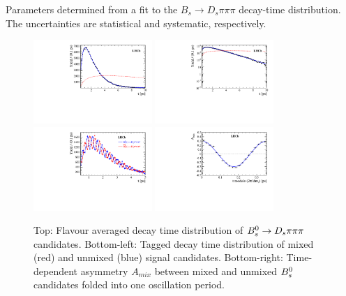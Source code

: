 \begin{table}[h]
\centering
\footnotesize
\caption{\small Parameters determined from a fit to the $B_s \to D_s \pi \pi\pi$ decay-time distribution. The uncertainties are statistical and systematic, respectively.}
	\renewcommand{\arraystretch}{1.25}
	
\label{tab:normFitResults}
\end{table}

\begin{figure}[h]
	\centering
		\includegraphics[width=0.4\textwidth, height = !]{figs/timeFit/norm_new/h_t.pdf} 
		\includegraphics[width=0.4\textwidth, height = !]{figs/timeFit/norm_new/h_t_log.pdf} 
		\includegraphics[width=0.4\textwidth, height = !]{figs/timeFit/norm_new/h_t_mixed.pdf} 
		\includegraphics[width=0.4\textwidth, height = !]{figs/timeFit/norm_new/h_asym.pdf} 		
		\caption{
		\footnotesize Top: Flavour averaged decay time distribution of ${{B}^0_{s}}\rightarrow{\ensuremath{{D}_{s}}}{\ensuremath{\pi}}{\ensuremath{\pi}}{\ensuremath{\pi}}$ candidates. 
Bottom-left: Tagged decay time distribution of mixed (red) and unmixed (blue) signal candidates. 
Bottom-right: Time-dependent asymmetry $A_{mix}$ between mixed and unmixed ${{B}^0_{s}}$ candidates folded into one oscillation period.} 		
		\label{fig:tFitNorm}
\end{figure}	

